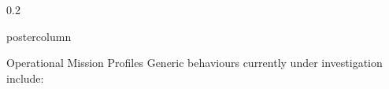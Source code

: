 \documentclass[final,hyperref={pdfpagelabels=false}]{beamer}
\def\colwidth{0.2\linewidth}
\begin{document}
\begin{frame}[fragile]
\begin{columns}[T]
\begin{column}{\colwidth}
\begin{beamercolorbox}[center,wd=\textwidth]{postercolumn}
\begin{minipage}[T]{.98\textwidth}
{   

          \begin{block}{Operational Mission Profiles}
            Generic behaviours currently under investigation include:

\end{block}}
\end{minipage}
\end{beamercolorbox}
\end{column}
\end{columns}
\end{frame}
\end{document}
